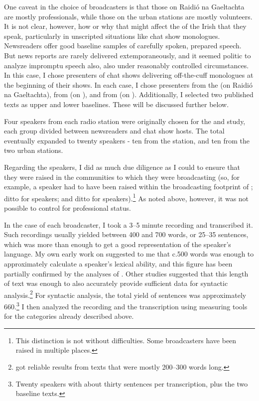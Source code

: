 \documentclass[output=paper,colorlinks,citecolor=brown]{langscibook}
\begin{document}
One caveat in the choice of broadcasters is that those on Raidió na Gaeltachta are mostly professionals, while those on the urban stations are mostly volunteers. It is not clear, however, how or why that might affect the  of the Irish that they speak, particularly in unscripted situations like chat show monologues. Newsreaders offer good baseline samples of carefully spoken, prepared speech. But news reports are rarely delivered extemporaneously, and it seemed politic to analyze impromptu speech also, also under reasonably controlled circumstances. In this case, I chose presenters of chat shows delivering off-the-cuff monologues at the beginning of their shows. In each case, I chose presenters from the  (on Raidió na Gaeltachta), from  (on ), and from  (on ). Additionally, I selected two published texts as upper and lower baselines. These will be discussed further below.

Four speakers from each radio station were originally chosen for the  and  study, each group divided between newsreaders and chat show hosts. The total eventually expanded to twenty speakers - ten from the  station, and ten from the two urban stations.

Regarding the speakers, I did as much due diligence as I could to ensure that they were raised in the communities to which they were broadcasting (so, for example, a  speaker had to have been raised within the broadcasting footprint of ; ditto for  speakers; and ditto for  speakers).\footnote{This distinction is not without difficulties. Some broadcasters have been raised in multiple places.} As noted above, however, it was not possible to control for professional status.

In the case of each broadcaster, I took a 3--5 minute recording and transcribed it. Such recordings usually yielded between 400 and 700 words, or 25--35 sentences, which was more than enough to get a good representation of the speaker's language. My own early work on  suggested to me that c.500 words was enough to approximately calculate a speaker's lexical ability, and this figure has been partially confirmed by the analyses of \citet{ob:McCarthy2007}. Other studies suggested that this length of text was enough to also accurately provide sufficient data for syntactic analysis.\footnote{\citet{ob:Snowdon1996} got reliable results from texts that were mostly 200--300 words long.} For syntactic analysis, the total yield of sentences was approximately 660.\footnote{Twenty speakers with about thirty sentences per transcription, plus the two baseline texts.} I then analyzed the recording and the transcription using measuring tools for the categories already described above.
\end{document}
